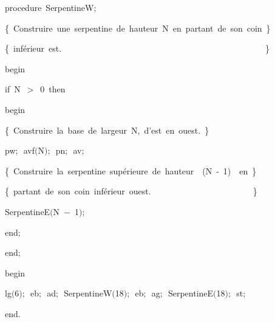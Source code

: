{\pagebreak[3] 
\vspace{\neglskip}\mbox{\blc  \blk\idt  \mcl procedure\idt \ SerpentineW$;$}\par 
\vspace{\neglskip}\mbox{\blc  \blk\blk\idt  \cmt  \{\ Construire\ une\ serpentine\ de\ hauteur\ N\ en\ partant\ de\ son\ coin\ \}\idt }\par 
\vspace{\neglskip}\mbox{\blc  \blk\blk\idt  \cmt  \{\ inférieur\ est.\ \ \ \ \ \ \ \ \ \ \ \ \ \ \ \ \ \ \ \ \ \ \ \ \ \ \ \ \ \ \ \ \ \ \ \ \ \ \ \ \ \ \ \ \ \ \ \ \}\idt }\par 
\vspace{\neglskip}\mbox{\blc  \blk\idt  \mcl begin\idt }\par 
\pagebreak[3] 
\vspace{\neglskip}\mbox{\blc  \blk\blk\idt  \mcl if\idt \ N\ $>$\ 0\ \mcl then\idt }\par 
\vspace{\neglskip}\mbox{\blc  \blk\blk\blk\idt  \mcl begin\idt }\par 
\vspace{\neglskip}\mbox{\blc  \blk\blk\blk\blk\idt  \cmt  \{\ Construire\ la\ base\ de\ largeur\ N,\ d{'}est\ en\ ouest.\ \}\idt }\par 
\vspace{\neglskip}\mbox{\blc  \blk\blk\blk\blk\idt  pw$;$\ avf$($N$)$$;$\ pn$;$\ av$;$\ }\par 
\vspace{\neglskip}\mbox{\blc  \blk\blk\blk\blk\idt  \cmt  \{\ Construire\ la\ serpentine\ supérieure\ de\ hauteur\ \ (N\ -\ 1)\ \ en\ \}\idt }\par 
\vspace{\neglskip}\mbox{\blc  \blk\blk\blk\blk\idt  \cmt  \{\ partant\ de\ son\ coin\ inférieur\ ouest.\ \ \ \ \ \ \ \ \ \ \ \ \ \ \ \ \ \ \ \ \ \ \ \ \}\idt }\par 
\vspace{\neglskip}\mbox{\blc  \blk\blk\blk\blk\idt  SerpentineE$($N\ $-$\ 1$)$$;$}\par 
\vspace{\neglskip}\mbox{\blc  \blk\blk\blk\idt  \mcl end\idt $;$\ \ }\par 
\vspace{\neglskip}\mbox{\blc  \blk\idt  \mcl end\idt $;$}\par 
\medskip

\vspace{\neglskip}\mbox{\blc  \idt  \mcl begin\idt }\par 
\vspace{\neglskip}\mbox{\blc  \blk\idt  lg$($6$)$$;$\ eb$;$\ ad$;$\ SerpentineW$($18$)$$;$\ eb$;$\ ag$;$\ SerpentineE$($18$)$$;$\ st$;$\ }\par 
\vspace{\neglskip}\mbox{\blc  \idt  \mcl end\idt $.$}\par 
\medskip


\medskip }

